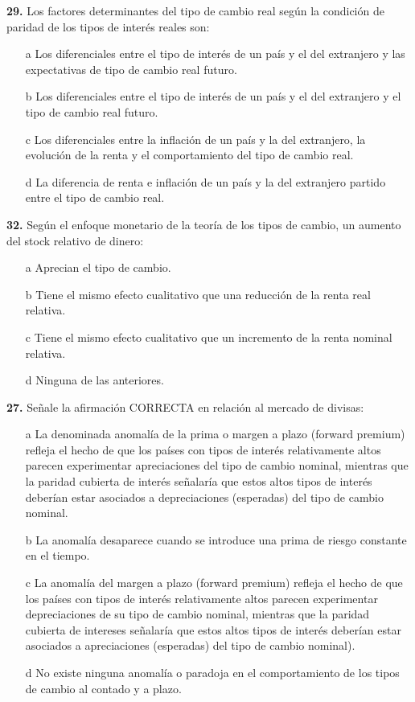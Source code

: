 \documentclass{nuevotema}
\begin{document}

\textbf{29.}  Los factores determinantes del tipo de cambio real según la condición de paridad de los tipos de interés reales son:
\begin{enumerate}
	\item[a] Los diferenciales entre el tipo de interés de un país y el del extranjero y las expectativas de tipo de cambio real futuro.
	\item[b] Los diferenciales entre el tipo de interés de un país y el del extranjero y el tipo de cambio real futuro.
	\item[c] Los diferenciales entre la inflación de un país y la del extranjero, la evolución de la renta y el comportamiento del tipo de cambio real.
	\item[d] La diferencia de renta e inflación de un país y la del extranjero partido entre el tipo de cambio real.
\end{enumerate}



\textbf{32.} Según el enfoque monetario de la teoría de los tipos de cambio, un aumento del stock relativo de dinero:
\begin{enumerate}
	\item[a] Aprecian el tipo de cambio.
	\item[b] Tiene el mismo efecto cualitativo que una reducción de la renta real relativa.
	\item[c] Tiene el mismo efecto cualitativo que un incremento de la renta nominal relativa.
	\item[d] Ninguna de las anteriores.
\end{enumerate}


\textbf{27.} Señale la afirmación CORRECTA en relación al mercado de divisas:
\begin{enumerate}
	\item[a] La denominada anomalía de la prima o margen a plazo (forward premium) refleja el hecho de que los países con tipos de interés relativamente altos parecen experimentar apreciaciones del tipo de cambio nominal, mientras que la paridad cubierta de interés señalaría que estos altos tipos de interés deberían estar asociados a depreciaciones (esperadas) del tipo de cambio nominal.
	\item[b] La anomalía desaparece cuando se introduce una prima de riesgo constante en el tiempo.
	\item[c] La anomalía del margen a plazo (forward premium) refleja el hecho de que los países con tipos de interés relativamente altos parecen experimentar depreciaciones de su tipo de cambio nominal, mientras que la paridad cubierta de intereses señalaría que estos altos tipos de interés deberían estar asociados a apreciaciones (esperadas) del tipo de cambio nominal).
	\item[d] No existe ninguna anomalía o paradoja en el comportamiento de los tipos de cambio al contado y a plazo. 
\end{enumerate}
\end{document}
